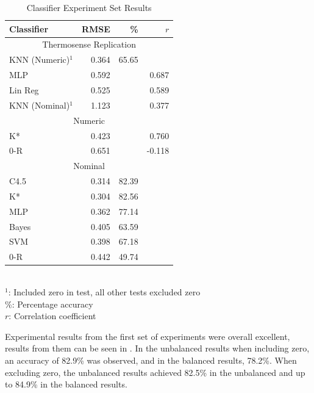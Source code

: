 \documentclass[../thesis/thesis.tex]{subfiles}
\begin{document}
\begin{table}
\centering
\begin{tabular}{|l|r|r|r|}
\hline
\textbf{Classifier} & \textbf{RMSE} & \textbf{\%} & \textbf{$r$} \\ \hline
\multicolumn{4}{|c|}{Thermosense Replication}                    \\ \hline
KNN (Numeric)$^1$   & 0.364         & 65.65       &              \\ \hline
MLP                 & 0.592         &             & 0.687        \\ \hline
Lin Reg             & 0.525         &             & 0.589        \\ \hline
KNN (Nominal)$^1$   & 1.123         &             & 0.377        \\ \hline
\multicolumn{4}{|c|}{Numeric}                                    \\ \hline
K*                  & 0.423         &             & 0.760        \\ \hline
0-R                 & 0.651         &             & -0.118       \\ \hline
\multicolumn{4}{|c|}{Nominal}                                    \\ \hline
C4.5                & 0.314         & 82.39       &              \\ \hline
K*                  & 0.304         & 82.56       &              \\ \hline
MLP                 & 0.362         & 77.14       &              \\ \hline
Bayes               & 0.405         & 63.59       &              \\ \hline
SVM                 & 0.398         & 67.18       &              \\ \hline
0-R                 & 0.442         & 49.74       &              \\ \hline
\end{tabular}\\ 
$^1$: Included zero in test, all other tests excluded zero \\
\%: Percentage accuracy \\
$r$: Correlation coefficient \\
\caption{Classifier Experiment Set Results}
\label{tab:results:set1}
\end{table}

Experimental results from the first set of experiments were overall excellent, results from them can be seen in . In the unbalanced results when including zero, an accuracy of 82.9\% was observed, and in the balanced results, 78.2\%.  When excluding zero, the unbalanced results achieved 82.5\% in the unbalanced and up to 84.9\% in the balanced results.
\end{document}
